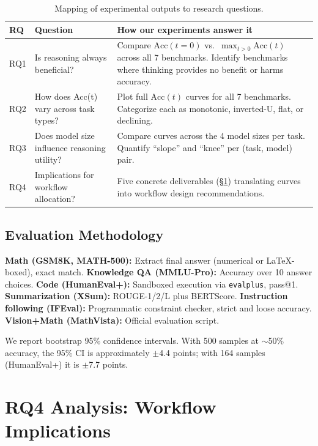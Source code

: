 \documentclass[11pt]{article}
\begin{document}
\begin{table}[h]
\centering
\caption{Mapping of experimental outputs to research questions.}
\label{tab:rq-mapping}
\small
\begin{tabular}{@{}p{1.2cm}p{4.5cm}p{8.3cm}@{}}
\toprule
\textbf{RQ} & \textbf{Question} & \textbf{How our experiments answer it} \\
\midrule
RQ1 & Is reasoning always beneficial? & Compare $\text{Acc}(t=0)$ vs.\ $\max_{t > 0} \text{Acc}(t)$ across all 7 benchmarks. Identify benchmarks where thinking provides no benefit or harms accuracy. \\
\addlinespace
RQ2 & How does Acc(t) vary across task types? & Plot full $\text{Acc}(t)$ curves for all 7 benchmarks. Categorize each as monotonic, inverted-U, flat, or declining. \\
\addlinespace
RQ3 & Does model size influence reasoning utility? & Compare curves across the 4 model sizes per task. Quantify ``slope'' and ``knee'' per (task, model) pair. \\
\addlinespace
RQ4 & Implications for workflow allocation? & Five concrete deliverables (\S\ref{sec:rq4}) translating curves into workflow design recommendations. \\
\bottomrule
\end{tabular}
\end{table}

\subsection{Evaluation Methodology}

\textbf{Math (GSM8K, MATH-500):} Extract final answer (numerical or \LaTeX-boxed), exact match. \textbf{Knowledge QA (MMLU-Pro):} Accuracy over 10 answer choices. \textbf{Code (HumanEval+):} Sandboxed execution via \texttt{evalplus}, pass@1. \textbf{Summarization (XSum):} ROUGE-1/2/L plus BERTScore. \textbf{Instruction following (IFEval):} Programmatic constraint checker, strict and loose accuracy. \textbf{Vision+Math (MathVista):} Official evaluation script.

We report bootstrap 95\% confidence intervals. With 500 samples at $\sim$50\% accuracy, the 95\% CI is approximately $\pm$4.4 points; with 164 samples (HumanEval+) it is $\pm$7.7 points.

\section{RQ4 Analysis: Workflow Implications}
\label{sec:rq4}
\end{document}
